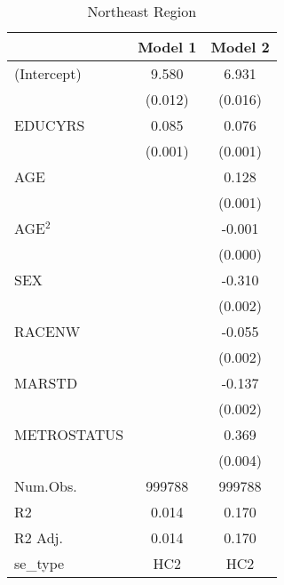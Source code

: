 \documentclass[12pt, English]{article}
\begin{document}
\begin{table}
\centering %
    \caption{Northeast Region}
    \vspace{7.5mm} %
\begin{tabular}[t]{lcc}
\toprule
  & Model 1 & Model 2\\
\midrule
(Intercept) & 9.580 & 6.931\\
 & (0.012) & (0.016)\\
EDUCYRS & 0.085 & 0.076\\
 & (0.001) & (0.001)\\
AGE &  & 0.128\\
 &  & (0.001)\\
AGE$^2$ &  & -0.001\\
 &  & (0.000)\\
SEX &  & -0.310\\
 &  & \vphantom{2} (0.002)\\
RACENW &  & -0.055\\
 &  & \vphantom{1} (0.002)\\
MARSTD &  & -0.137\\
 &  & (0.002)\\
METROSTATUS &  & 0.369\\
 &  & (0.004)\\
\midrule
Num.Obs. & 999788 & 999788\\
R2 & 0.014 & 0.170\\
R2 Adj. & 0.014 & 0.170\\
se\_type & HC2 & HC2\\
\bottomrule
\end{tabular}
\end{table}

\newpage
\end{document}
